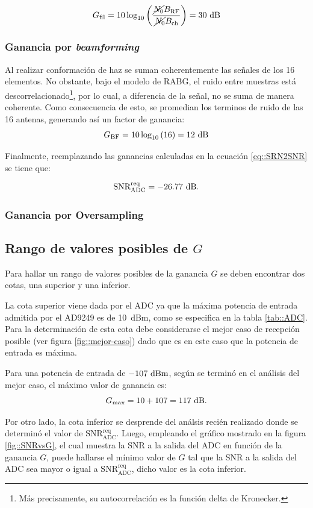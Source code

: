 \documentclass[../../main.tex]{subfiles}
\begin{document}
\[G_\textrm{fil} = 10 \log_{10}\left(\frac{\cancel{N_0} B_\textrm{RF}}{\cancel{N_0} B_\textrm{ch}}\right) = 30~\textrm{dB}\]

\subsubsection{Ganancia por \textit{beamforming}}
Al realizar conformación de haz se suman coherentemente las señales de los 16 elementos. No obstante, bajo el modelo de RABG, el ruido entre muestras está descorrelacionado\footnote{Más precisamente, su autocorrelación es la función delta de Kronecker.}, por lo cual, a diferencia de la señal, no se suma de manera coherente.
Como consecuencia de esto, se promedian los terminos de ruido de las 16 antenas, generando así un factor de ganancia:
\[G_\textrm{BF} = 10 \log_{10}{(16)} = 12~\textrm{dB}\]

Finalmente, reemplazando las ganancias calculadas en la ecuación \ref{eq::SRN2SNR} se tiene que:

\begin{equation}
    \textrm{SNR}^\textrm{req}_\textrm{ADC} = -26.77~\textrm{dB}.
    \label{eq::SNRreqADC}
\end{equation}

\subsubsection{Ganancia por Oversampling}

\subsection{Rango de valores posibles de $G$}
Para hallar un rango de valores posibles de la ganancia $G$ se deben encontrar dos cotas, una superior y una inferior.

La cota superior viene dada por el ADC ya que la máxima potencia de entrada admitida por el AD9249 es de 10~dBm, como se especifica en la tabla \ref{tab::ADC}. Para la determinación de esta cota debe considerarse el mejor caso de recepción posible (ver figura \ref{fig::mejor-caso}) dado que es en este caso que la potencia de entrada es máxima.

Para una potencia de entrada de $-107~\textrm{dBm}$, según se terminó en el análisis del mejor caso, el máximo valor de ganancia es:
\[G_\textrm{max} = 10 + 107 = 117~\textrm{dB}.\]

Por otro lado, la cota inferior se desprende del análsis recién realizado donde se determinó el valor de $\textrm{SNR}^\textrm{req}_\textrm{ADC}$. Luego, empleando el gráfico mostrado en la figura \ref{fig::SNRvsG}, el cual muestra la SNR a la salida del ADC en función de la ganancia $G$, puede hallarse el mínimo valor de $G$ tal que la SNR a la salida del ADC sea mayor o igual a $\textrm{SNR}^\textrm{req}_\textrm{ADC}$, dicho valor es la cota inferior.

\end{document}
